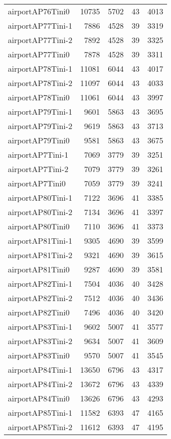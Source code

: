 \begin{longtable}{lrrrr}
airportAP76Tini0 & 10735 & 5702 & 43 & 4013 \\
airportAP77Tini-1 & 7886 & 4528 & 39 & 3319 \\
airportAP77Tini-2 & 7892 & 4528 & 39 & 3325 \\
airportAP77Tini0 & 7878 & 4528 & 39 & 3311 \\
airportAP78Tini-1 & 11081 & 6044 & 43 & 4017 \\
airportAP78Tini-2 & 11097 & 6044 & 43 & 4033 \\
airportAP78Tini0 & 11061 & 6044 & 43 & 3997 \\
airportAP79Tini-1 & 9601 & 5863 & 43 & 3695 \\
airportAP79Tini-2 & 9619 & 5863 & 43 & 3713 \\
airportAP79Tini0 & 9581 & 5863 & 43 & 3675 \\
airportAP7Tini-1 & 7069 & 3779 & 39 & 3251 \\
airportAP7Tini-2 & 7079 & 3779 & 39 & 3261 \\
airportAP7Tini0 & 7059 & 3779 & 39 & 3241 \\
airportAP80Tini-1 & 7122 & 3696 & 41 & 3385 \\
airportAP80Tini-2 & 7134 & 3696 & 41 & 3397 \\
airportAP80Tini0 & 7110 & 3696 & 41 & 3373 \\
airportAP81Tini-1 & 9305 & 4690 & 39 & 3599 \\
airportAP81Tini-2 & 9321 & 4690 & 39 & 3615 \\
airportAP81Tini0 & 9287 & 4690 & 39 & 3581 \\
airportAP82Tini-1 & 7504 & 4036 & 40 & 3428 \\
airportAP82Tini-2 & 7512 & 4036 & 40 & 3436 \\
airportAP82Tini0 & 7496 & 4036 & 40 & 3420 \\
airportAP83Tini-1 & 9602 & 5007 & 41 & 3577 \\
airportAP83Tini-2 & 9634 & 5007 & 41 & 3609 \\
airportAP83Tini0 & 9570 & 5007 & 41 & 3545 \\
airportAP84Tini-1 & 13650 & 6796 & 43 & 4317 \\
airportAP84Tini-2 & 13672 & 6796 & 43 & 4339 \\
airportAP84Tini0 & 13626 & 6796 & 43 & 4293 \\
airportAP85Tini-1 & 11582 & 6393 & 47 & 4165 \\
airportAP85Tini-2 & 11612 & 6393 & 47 & 4195 \\

\end{longtable}
